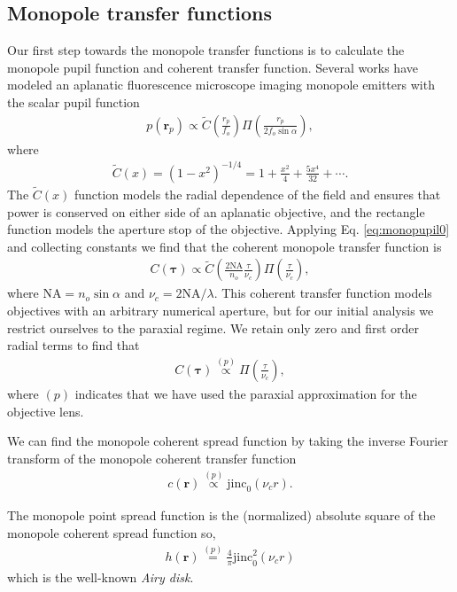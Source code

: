 \documentclass[]{osa-article}
\providecommand{\mb}[1]{\mathbf{#1}}
\providecommand{\rp}{\mathbf{r}_p}
\providecommand{\bs}[1]{\boldsymbol{#1}}
\providecommand{\taup}{\bs{\tau}}
\begin{document}
\subsection{Monopole transfer functions}
Our first step towards the monopole transfer functions is to calculate the
monopole pupil function and coherent transfer function. Several works
\cite{petrov2017, backlund2018} have modeled an aplanatic fluorescence
microscope imaging monopole emitters with the scalar pupil function
\begin{align}
  p(\rp) \propto \tilde{C}\left(\frac{r_p}{f_o}\right)\Pi\left(\frac{r_p}{2f_o\sin\alpha}\right), 
\end{align}
where
\begin{align}
  \tilde{C}(x) = (1 - x^2)^{-1/4} = 1 + \frac{x^2}{4} + \frac{5x^4}{32} + \cdots. 
\end{align}
The $\tilde{C}(x)$ function models the radial dependence of the field and
ensures that power is conserved on either side of an aplanatic objective, and
the rectangle function models the aperture stop of the objective. Applying Eq.
\ref{eq:monopupil0} and collecting constants we find that the coherent monopole
transfer function is
\begin{align}
  C(\taup) \propto \tilde{C}\left(\frac{2\text{NA}}{n_o}\frac{\tau}{\nu_c}\right)\Pi\left(\frac{\tau}{\nu_c}\right), \label{eq:coherentmonopole}
\end{align}
where $\text{NA} = n_o\sin\alpha$ and $\nu_c = 2\text{NA}/\lambda$. This
coherent transfer function models objectives with an arbitrary numerical
aperture, but for our initial analysis we restrict ourselves to the paraxial
regime. We retain only zero and first order radial terms to find that  
\begin{align}
  C(\taup) \stackrel{(p)}{\propto} \Pi\left(\frac{\tau}{\nu_c}\right), 
\end{align}
where $(p)$ indicates that we have used the paraxial approximation for the
objective lens.

We can find the monopole coherent spread function by taking the inverse Fourier
transform of the monopole coherent transfer function
\begin{align}
  c(\mb{r}) \stackrel{(p)}{\propto} \text{jinc}_0(\nu_c r).
\end{align}

The monopole point spread function is the (normalized) absolute square of the
monopole coherent spread function so,
\begin{align}
  h(\mb{r}) \stackrel{(p)}{=} \frac{4}{\pi}\text{jinc}_0^2(\nu_c r)
\end{align}
which is the well-known \textit{Airy disk}.
\end{document}

